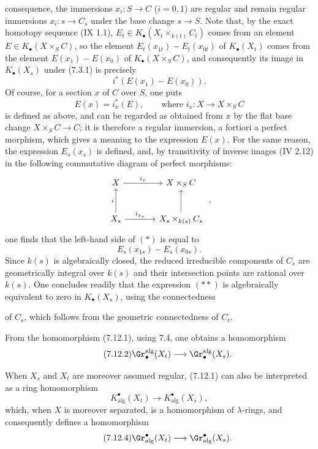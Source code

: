 %
consequence, the immersions \(x_i:S\to C\) (\(i=0,1\)) are regular and remain regular immersions \(x_i:s\to C_s\) under the base change \(s\to S\). Note that, by the exact homotopy sequence (IX 1.1), \(E_t\in K_\bullet(X_t\times_{k(t)}C_t)\) comes from an element \(E\in K_\bullet(X\times_SC)\), so the element \(E_t(x_{1t})-E_t(x_{0t})\) of \(K_\bullet(X_t)\) comes from the element \(E(x_1)-E(x_0)\) of \(K_\bullet(X\times_SC)\), and consequently its image in \(K_\bullet(X_s)\) under (7.3.1) is precisely
\[
  i^*(E(x_1)-E(x_0)).
  \tag{*}
\]
Of course, for a section \(x\) of \(C\) over \(S\), one puts
\[
  E(x)=i_x^*(E),\qquad\text{where } i_x:X\longrightarrow X\times_SC
\]
is defined as above, and can be regarded as obtained from \(x\) by the flat base change \(X\times_SC\to C\); it is therefore a regular immersion, a fortiori a perfect morphism, which gives a meaning to the expression \(E(x)\). For the same reason, the expression \(E_s(x_s)\) is defined, and, by transitivity of inverse images (IV 2.12) in the following commutative diagram of perfect morphisms:
\[
\begin{tikzcd}[column sep=large,row sep=large]
X \arrow[r,"i_x"] & X\times_SC\\
X_s \arrow[u,"i"] \arrow[r,"i_{x_s}"] & X_s\times_{k(s)}C_s \arrow[u]
\end{tikzcd}
\;,
\]
one finds that the left-hand side of \((*)\) is equal to
\[
  E_s(x_{1s})-E_s(x_{0s}).
  \tag{**}
\]
Since \(k(s)\) is algebraically closed, the reduced irreducible components of \(C_s\) are geometrically integral over \(k(s)\) and their intersection points are rational over \(k(s)\). One concludes readily that the expression \((**)\) is algebraically equivalent to zero in \(K_\bullet(X_s)\), using the connectedness

%

of \(C_s\), which follows from the geometric connectedness of \(C_t\).

From the homomorphism (7.12.1), using 7.4, one obtains a homomorphism
\begin{equation}\tag{7.12.2}
  \Gr_\bullet^{\mathrm{alg}}(X_t)\longrightarrow \Gr_\bullet^{\mathrm{alg}}(X_s).
\end{equation}

When \(X_s\) and \(X_t\) are moreover assumed regular, (7.12.1) can also be interpreted as a ring homomorphism
\begin{equation}\tag{7.12.3}
  K^\bullet_{\mathrm{alg}}(X_t)\longrightarrow K^\bullet_{\mathrm{alg}}(X_s),
\end{equation}
which, when \(X\) is moreover separated, is a homomorphism of \(\lambda\)-rings, and consequently defines a homomorphism
\begin{equation}\tag{7.12.4}
  \Gr^\bullet_{\mathrm{alg}}(X_t)\longrightarrow \Gr^\bullet_{\mathrm{alg}}(X_s).
\end{equation}

